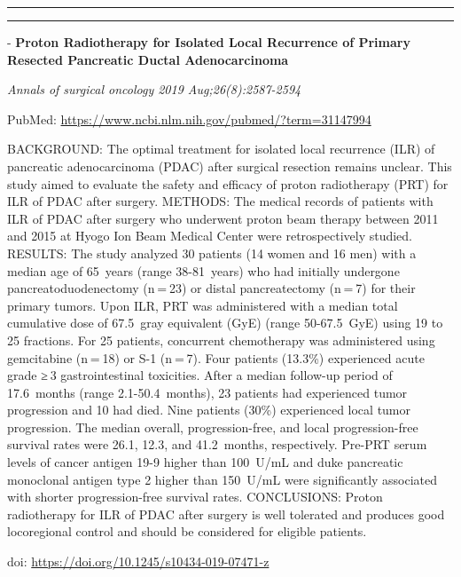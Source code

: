 \documentclass[]{article}
\begin{document}
\begin{center}\rule{0.5\linewidth}{\linethickness}\end{center}

\begin{center}\rule{0.5\linewidth}{\linethickness}\end{center}

 - \textbf{Proton Radiotherapy for Isolated Local Recurrence of Primary
Resected Pancreatic Ductal Adenocarcinoma}

\emph{Annals of surgical oncology 2019 Aug;26(8):2587-2594}

PubMed: \url{https://www.ncbi.nlm.nih.gov/pubmed/?term=31147994}

BACKGROUND: The optimal treatment for isolated local recurrence (ILR) of
pancreatic adenocarcinoma (PDAC) after surgical resection remains
unclear. This study aimed to evaluate the safety and efficacy of proton
radiotherapy (PRT) for ILR of PDAC after surgery. METHODS: The medical
records of patients with ILR of PDAC after surgery who underwent proton
beam therapy between 2011 and 2015 at Hyogo Ion Beam Medical Center were
retrospectively studied. RESULTS: The study analyzed 30 patients (14
women and 16 men) with a median age of 65~years (range 38-81~years) who
had initially undergone pancreatoduodenectomy (n = 23) or distal
pancreatectomy (n = 7) for their primary tumors. Upon ILR, PRT was
administered with a median total cumulative dose of 67.5~gray equivalent
(GyE) (range 50-67.5~GyE) using 19 to 25 fractions. For 25 patients,
concurrent chemotherapy was administered using gemcitabine (n = 18) or
S-1 (n = 7). Four patients (13.3\%) experienced acute grade ≥ 3
gastrointestinal toxicities. After a median follow-up period of
17.6~months (range 2.1-50.4~months), 23 patients had experienced tumor
progression and 10 had died. Nine patients (30\%) experienced local
tumor progression. The median overall, progression-free, and local
progression-free survival rates were 26.1, 12.3, and 41.2~months,
respectively. Pre-PRT serum levels of cancer antigen 19-9 higher than
100~U/mL and duke pancreatic monoclonal antigen type 2 higher than
150~U/mL were significantly associated with shorter progression-free
survival rates. CONCLUSIONS: Proton radiotherapy for ILR of PDAC after
surgery is well tolerated and produces good locoregional control and
should be considered for eligible patients.

doi: \url{https://doi.org/10.1245/s10434-019-07471-z}

{}
\end{document}
